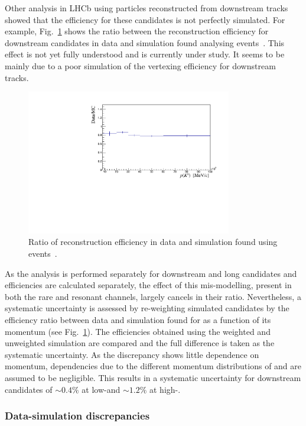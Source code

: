 Other analysis in LHCb using particles reconstructed from downstream tracks showed that
the efficiency for these candidates is not perfectly simulated.
For example, Fig.~\ref{KS_vtxeff} shows the ratio between the reconstruction efficiency for downstream candidates
in data and simulation found analysing \KS events~\cite{Blake:1631348}. This effect is not
yet fully understood and is currently under study. It seems to be mainly due to a poor simulation
of the vertexing efficiency for downstream tracks.
%
\begin{figure}
\centering
\includegraphics[width=0.8\textwidth]{Lmumu/figs/DDvtx_eff_POwen.pdf}
\caption{Ratio of reconstruction efficiency in data and simulation found using \KS events~\cite{Blake:1631348}.}
\label{KS_vtxeff}
\end{figure}
%
As the analysis is performed separately for downstream and long candidates and efficiencies are calculated separately, 
the effect of this mis-modelling, present in both the rare and resonant channels, largely cancels in their ratio.
Nevertheless, a systematic uncertainty is assessed by re-weighting simulated candidates 
by the efficiency ratio between data and simulation found for \KS as a function of its momentum (see Fig.~\ref{KS_vtxeff}). 
The efficiencies obtained using the weighted and unweighted simulation are compared and the full difference is taken as the systematic uncertainty. 
As the discrepancy shows little dependence on momentum, dependencies due to the different momentum 
distributions of \Lz and \KS are assumed to be negligible. This results in a systematic uncertainty for downstream candidates
of $\sim 0.4\%$ at low-\qsq and $\sim 1.2\%$ at high-\qsq.

\subsubsection{Data-simulation discrepancies}

